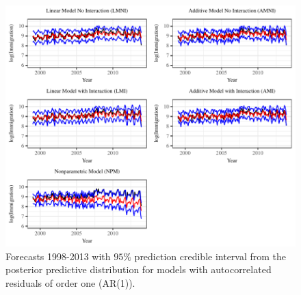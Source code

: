 \documentclass{article}\usepackage[]{graphicx}\usepackage[]{color}
\begin{document}
\begin{figure}[H]
\centering
\includegraphics[scale=1]{Long_run_results_AR1.pdf}
\caption{Forecasts 1998-2013 with $95\%$ prediction credible interval from the posterior predictive distribution for models with autocorrelated residuals of order one (AR(1)).}
\label{fig:prediction AR(1) long}
\end{figure}
\end{document}
